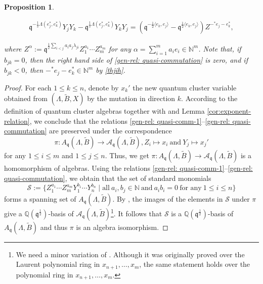 \documentclass[reqno,12pt]{amsart}
\numberwithin{equation}{section}
\def\lr#1{\langle #1\rangle} \def\fin{\hfill$\square$}  \def\lra{\longrightarrow} \def\mod{\mbox{\rm \textbf{mod}}\,}\def\Mod{\mbox{\rm mod}\,}\def\top{\mbox{\rm top}\,}\def\soc{\mbox{\rm soc}\,}
\theoremstyle{plain} %
\newtheorem{proposition}[theorem]{\bf Proposition}
\theoremstyle{definition} %
\begin{document}
\begin{proposition}
\begin{itemize}
\begin{equation}
\begin{split}
        \mathfrak{q}^{-\frac{1}{2}\Lambda(e_j^\ast,e_k^\ast)}Y_jY_k-\mathfrak{q}^{\frac{1}{2}\Lambda( e_j^\ast,e_k^\ast)}Y_kY_j
        =(\mathfrak{q}^{-\frac{1}{2}\lr{e_k,e_j}}-\mathfrak{q}^{\frac{1}{2}\lr{e_k,e_j}})Z^{-{^\ast} e_j-e_k^\ast},
    \end{split}
    \end{equation}
\end{itemize}
where $Z^\alpha:=\mathfrak{q}^{\frac{1}{2}\sum_{i<j}a_ia_j\lambda_{ji}}Z_{1}^{a_1}\cdots Z_{m}^{a_m}$ for any $\alpha=\sum\limits_{i=1}^ma_ie_i\in \mathbb{N}^m$. Note that, if $b_{jk}=0$, then the right hand side of \eqref{gen-rel: quasi-commutation} is zero, and if $b_{jk}<0$, then $-^\ast e_j-e_k^\ast\in \mathbb{N}^m$ by \eqref{thjih}.
\end{proposition}
\begin{proof}
For each $1\leq k\leq n$, denote by $x_k'$ the new quantum cluster variable obtained from $(\Lambda, \widetilde{B},X)$ by the mutation in direction $k$. According to the definition of quantum cluster algebras together with \cite[Proposition 7.1]{BZ05} and Lemma \ref{cor:exponent-relation}, we conclude that the relations \eqref{gen-rel: quasi-comm-1}--\eqref{gen-rel: quasi-commutation} are preserved under
the correspondence $$\pi:A_{\mathfrak{q}}(\Lambda,\widetilde{B})\longrightarrow \mathcal{A}_{\mathfrak{q}}(\Lambda,\widetilde{B}), Z_i\mapsto x_i~\text{and}~Y_j\mapsto x_{j}'$$
for any $1\leq i\leq m$ and $1\leq j\leq n$. Thus, we get $\pi:A_{\mathfrak{q}}(\Lambda,\widetilde{B})\to \mathcal{A}_{\mathfrak{q}}(\Lambda,\widetilde{B})$ is a homomorphism of algebras.
Using the relations \eqref{gen-rel: quasi-comm-1}--\eqref{gen-rel: quasi-commutation}, we obtain that the set of standard monomials $$\mathscr{S}:=\{Z_1^{a_1}\cdots Z_m^{a_m}Y_1^{b_1}\cdots Y_n^{b_n}\mid \text{all}~a_i,b_j\in \mathbb{N}~\text{and}~a_ib_i=0~\text{for~any}~1\leq i\leq n\}$$ forms a spanning set of $A_{\mathfrak{q}}(\Lambda,\widetilde{B})$.
By \cite[Theorems 7.3, 7.5]{BZ05}, the images of the elements in $\mathscr{S}$ under $\pi$ give a $\mathbb{Q}(\mathfrak{q}^{\frac{1}{2}})$-basis of $\mathcal{A}_{\mathfrak{q}}(\Lambda,\widetilde{B})$\footnote{We need a minor variation of \cite[Theorem 7.5]{BZ05}. Although it was originally proved over the Laurent polynomial ring in $x_{n+1},\ldots, x_m$, the same statement holds over the polynomial ring in $x_{n+1},\ldots, x_m$.}. It follows that $\mathscr{S}$ is a $\mathbb{Q}(\mathfrak{q}^{\frac{1}{2}})$-basis of $A_{\mathfrak{q}}(\Lambda,\widetilde{B})$ and thus $\pi$ is an algebra isomorphism.
\end{proof}
\end{document}
